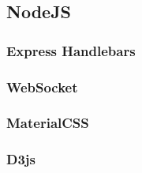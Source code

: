 \subsection{NodeJS}
\label{sec:nodejs}

\subsubsection{Express Handlebars}
\label{sec:express handlebars}

\subsubsection{WebSocket}
\label{sec:WebSocket}

\subsubsection{MaterialCSS}
\label{sec:materialCSS}

\subsubsection{D3js}
\label{sec:d3js}